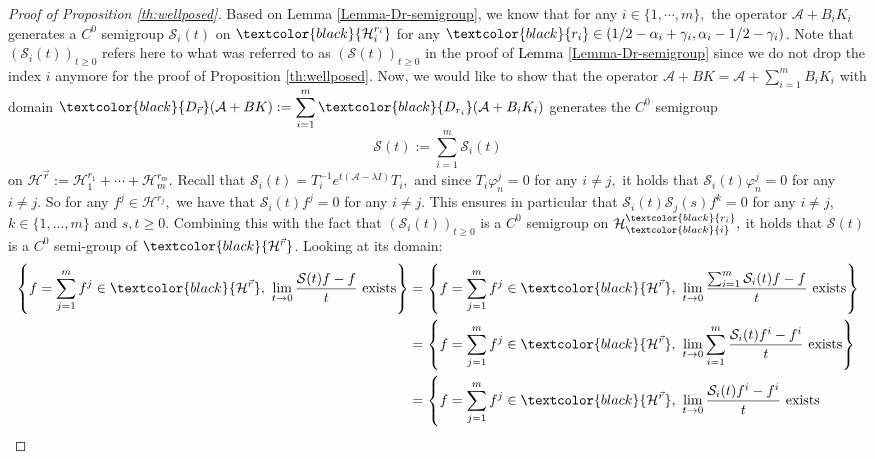 \documentclass[11pt, dvipsnames]{amsart}
\begin{document}
\begin{proof}[Proof of Proposition \ref{th:wellposed}]
   Based on Lemma \ref{Lemma-Dr-semigroup}, we know that for any $i\in \{1,\cdots, m\},$ the operator $\mathcal{A}+B_iK_i$ generates a $C^0$ semigroup $\mathcal{S}_i(t)$ on $\textcolor{black}{\mathcal{H}^{r_{i}}_i}$ for any $\textcolor{black}{r_{i}}\in (1/2-\alpha_i+\gamma_{i},\alpha_i-1/2-\gamma_{i})$. Note that $(\mathcal{S}_{i}(t))_{t\geq 0}$ refers here to what was referred to as $(\mathcal{S}(t))_{t\geq 0}$ in the proof of \textcolor{black}{Lemma \ref{Lemma-Dr-semigroup}} since we do not drop the index $i$ anymore for the proof of Proposition \ref{th:wellposed}. Now, we would like to show that the operator $\mathcal{A}+BK=\mathcal{A}+\displaystyle\sum_{i=1}^mB_iK_i$ with domain $\textcolor{black}{D_{ \vec r}}(\mathcal{A}+BK):=\displaystyle\sum_{i=1}^m \textcolor{black}{D_{r_{i}}}(\mathcal{A}+B_iK_i)$ generates the $C^0$ semigroup 
   \begin{equation}
       \mathcal{S}(t) := \displaystyle\sum_{i=1}^m \mathcal{S}_i(t)
   \end{equation}
   on \textcolor{black}{$\mathcal{H}^{\vec{r}}:=\mathcal{H}^{r_{1}}_1+\cdots+\mathcal{H}^{r_{m}}_m.$} Recall that $\mathcal{S}_i(t)=T^{-1}_ie^{t(\mathcal{A}-\lambda I)}T_i,$ and since $T_i\varphi_n^j=0$ for any $i\neq j,$ it holds that $\mathcal{S}_i(t)\varphi_n^j=0$ for any $i\neq j.$ So for any $f^j\in \mathcal{H}^{r_j},$ we have that $\mathcal{S}_i(t)f^j=0$ for any $i\neq j.$ This ensures in particular that $\mathcal{S}_i(t)\mathcal{S}_j(s)f^k=0$ for any $i\neq j$, $k\in\{1,...,m\}$ and $s,t\geq 0$. Combining this with the fact that  $(\mathcal{S}_{i}(t))_{t\geq0}$ is a $C^{0}$ semigroup on $\mathcal{H}^{\textcolor{black}{r_{i}}}_{\textcolor{black}{i}},$ it holds that $\mathcal{S}(t)$ is a $C^0$ semi-group of $\textcolor{black}{\mathcal{H}^{\vec r}}$. Looking at its domain:
   \begin{align*}
       \left\{ f=\sum_{j=1}^m f^j\in \textcolor{black}{\mathcal{H}^{\vec r}}, \ \lim_{t\rightarrow 0}\frac{\mathcal{S}(t)f-f}{t}\ \text{exists}\right\}&=\left\{ f=\sum_{j=1}^m f^j\in \textcolor{black}{\mathcal{H}^{\vec r}}, \ \lim_{t\rightarrow 0}\frac{\sum_{i=1}^m \mathcal{S}_i(t)f-f}{t}\ \text{exists}\right\}\\
       &=\left\{ f=\sum_{j=1}^m f^j\in \textcolor{black}{\mathcal{H}^{\vec r}}, \ \lim_{t\rightarrow 0}\sum_{i=1}^m\frac{\mathcal{S}_i(t)f^i-f^i}{t}\ \text{exists}\right\}\\
       &=\left\{ f=\sum_{j=1}^m f^j\in \textcolor{black}{\mathcal{H}^{\vec r}}, \ \lim_{t\rightarrow 0}\frac{\mathcal{S}_i(t)f^i-f^i}{t}\ \text{exists}\right.\\

\end{align*}
\end{proof}
\end{document}
